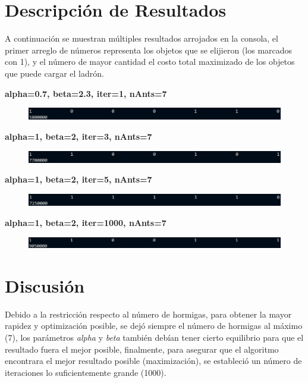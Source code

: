 \documentclass[12pt, a4paper]{article}
\begin{document}
\section{Descripción de Resultados}
A continuación se muestran múltiples resultados arrojados en la consola, el primer arreglo de números representa los objetos que se elijieron (los marcados con 1), y el número de mayor cantidad el costo total maximizado de los objetos que puede cargar el ladrón.

\textbf{alpha=0.7, beta=2.3, iter=1, nAnts=7}
\begin{figure}[!ht]
    \centering
    \includegraphics[width=\textwidth]{img/corrida1.png}
\end{figure}

\textbf{alpha=1, beta=2, iter=3, nAnts=7}
\begin{figure}[!ht]
    \centering
    \includegraphics[width=\textwidth]{img/corrida2.png}
\end{figure}

\textbf{alpha=1, beta=2, iter=5, nAnts=7}
\begin{figure}[!ht]
    \centering
    \includegraphics[width=\textwidth]{img/corrida3.png}
\end{figure}

\textbf{alpha=1, beta=2, iter=1000, nAnts=7}
\begin{figure}[!ht]
    \centering
    \includegraphics[width=\textwidth]{img/corrida4.png}
\end{figure}

\section{Discusión}
Debido a la restricción respecto al número de hormigas, para obtener la mayor rapidez y optimización posible, se dejó siempre el número de hormigas al máximo (7), los parámetros \emph{alpha} y \emph{beta} también debían tener cierto equilibrio para que el resultado fuera el mejor posible, finalmente, para asegurar que el algoritmo encontrara el mejor resultado posible (maximización), se estableció un número de iteraciones lo suficientemente grande (1000).
\end{document}
